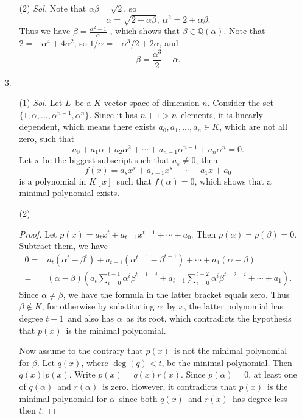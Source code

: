 \documentclass[12pt]{article}
\newcommand{\Q}{\mathbb{Q}}
\begin{document}
\begin{enumerate}
\begin{enumerate}
		\item[(2)]
		\textit{Sol.}
			Note that $\alpha\beta=\sqrt{2}$, so
			$$\alpha=\sqrt{2+\alpha\beta},\ \alpha^2=2+\alpha\beta.$$
			Thus we have $\beta=\frac{\alpha^2-1}{\alpha}$	, which shows that $\beta\in\Q(\alpha)$. Note that $2=-\alpha^4+4\alpha^2$, so $1/\alpha=-\alpha^3/2+2\alpha$, and
			$$\beta=\frac{\alpha^3}{2}-\alpha.$$
	\end{enumerate}
	\item[3.]
	\begin{enumerate}
		\item[(1)]
		\textit{Sol.}
			Let $L$\ be a $K$-vector space of dimension $n$. Consider the set $\{1,\alpha,...,\alpha^{n-1},\alpha^n\}$. Since it has $n+1>n$\ elements, it is linearly dependent, which means there exists $a_0,a_1,...,a_n\in K$, which are not all zero, such that
			$$a_0+a_1\alpha+a_2\alpha^2+\cdots+a_{n-1}\alpha^{n-1}+a_n\alpha^n=0.$$
			Let $s$\ be the biggest subscript such that $a_s\neq0$, then
			$$f(x)=a_sx^s+a_{s-1}x^s+\cdots+a_1x+a_0$$
			is a polynomial in $K[x]$\ such that $f(\alpha)=0$, which shows that a minimal polynomial exists.
		\item[(2)]
		\begin{proof}
			Let $p(x)=a_tx^t+a_{t-1}x^{t-1}+\cdots+a_0$. Then $p(\alpha)=p(\beta)=0$. Subtract them, we have
			$$\begin{aligned}
				0
				=&a_t(\alpha^t-\beta^t)+a_{t-1}(\alpha^{t-1}-\beta^{t-1})+\cdots+a_1(\alpha-\beta)\\
				=&(\alpha-\beta)\left(a_t\sum_{i=0}^{t-1}\alpha^i\beta^{t-1-i}+a_{t-1}\sum_{i=0}^{t-2}\alpha^i\beta^{t-2-i}+\cdots+a_1\right).
			\end{aligned}$$
			Since $\alpha\neq\beta$, we have the formula in the latter bracket equals zero. Thus $\beta\notin K$, for otherwise by substituting $\alpha$\ by $x$, the latter polynomial has degree $t-1$\ and also has $\alpha$\ as its root, which contradicts the hypothesis that $p(x)$\ is the minimal polynomial.\par
			\quad Now assume to the contrary that $p(x)$\ is not the minimal polynomial for $\beta$. Let $q(x)$, where $\deg(q)<t$, be the minimal polynomial. Then $q(x)|p(x)$. Write $p(x)=q(x)r(x)$. Since $p(\alpha)=0$, at least one of $q(\alpha)$\ and $r(\alpha)$\ is zero. However, it contradicts that $p(x)$\ is the minimal polynomial for $\alpha$\ since both $q(x)$\ and $r(x)$\ has degree less then $t$.
		\end{proof}
	\end{enumerate}

\end{enumerate}
\end{document}
